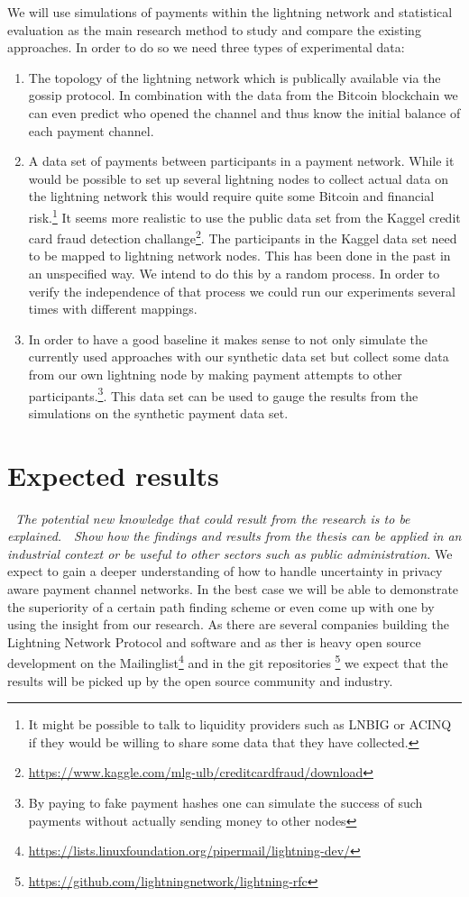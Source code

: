 \documentclass[a4paper]{paper}
\begin{document}
We will use simulations of payments within the lightning network and statistical evaluation as the main research method to study and compare the existing approaches.
In order to do so we need three types of experimental data:
\begin{enumerate}
\item The topology of the lightning network which is publically available via the gossip protocol. In combination with the data from the Bitcoin blockchain we can even predict who opened the channel and thus know the initial balance of each payment channel.
\item A data set of payments between participants in a payment network. While it would be possible to set up several lightning nodes to collect actual data on the lightning network this would require quite some Bitcoin and financial risk.\footnote{It might be possible to talk to liquidity providers such as LNBIG or ACINQ if they would be willing to share some data that they have collected.} It seems more realistic to use the public data set from the Kaggel credit card fraud detection challange\footnote{\url{https://www.kaggle.com/mlg-ulb/creditcardfraud/download}}. The participants in the Kaggel data set need to be mapped to lightning network nodes. This has been done in the past \cite{sivaraman2018routing} in an unspecified way. We intend to do this by a random process. In order to verify the independence of that process we could run our experiments several times with different mappings. 
\item In order to have a good baseline it makes sense to not only simulate the currently used approaches with our synthetic data set but collect some data from our own lightning node by making payment attempts to other participants.\footnote{By paying to fake payment hashes one can simulate the success of such payments without actually sending money to other nodes}. This data set can be used to gauge the results from the simulations on the synthetic payment data set.
\end{enumerate}

\section{Expected results}
\textit{ The potential new knowledge that could result from the research is to be explained.
 Show how the findings and results from the thesis can be applied in an industrial context or be
useful to other sectors such as public administration.}
We expect to gain a deeper understanding of how to handle uncertainty in privacy aware payment channel networks.
In the best case we will be able to demonstrate the superiority of a certain path finding scheme or even come up with one by using the insight from our research.
As there are several companies building the Lightning Network Protocol and software and as ther is heavy open source development on the Mailinglist\footnote{\url{https://lists.linuxfoundation.org/pipermail/lightning-dev/}} and in the git repositories \footnote{\url{https://github.com/lightningnetwork/lightning-rfc}} we expect that the results will be picked up by the open source community and industry.
\end{document}
